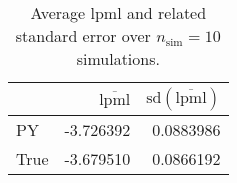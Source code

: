 \begin{table}[H]

\caption{Average lpml and related standard error over $n_{\text{sim}} = 10$ simulations.}
\centering
\begin{tabular}[t]{lrr}
\toprule
  & $\overbar{\text{lpml}}$ & $\text{sd}(\overbar{\text{lpml}})$\\
\midrule
PY & -3.726392 & 0.0883986\\
True & -3.679510 & 0.0866192\\
\bottomrule
\end{tabular}
\end{table}